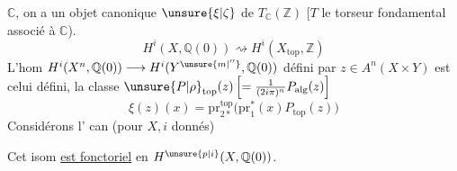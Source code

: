 $\mathbb C$, on a un objet canonique  $\unsure{\xi|\zeta}$ de $T_{\mathbb C}(\mathbb Z)$ [$T$ le torseur fondamental associé à $\mathbb C$).
\[
 H^i(X,\mathbb Q(0))\rightsquigarrow H^i(X_{\mathrm{top}},\mathbb Z)
\]
L'hom $H^i(X^n,\mathbb Q(0))\longrightarrow H^{i}(Y^{\unsure{m|''}},\mathbb Q(0))$ défini par  $z\in A^n(X\times Y)$ est celui défini,   la classe $\unsure{P|\rho}_{\mathrm{top}}(z)\left[=\frac{1}{(2i\pi)^n}P_{\mathrm{alg}}(z)\right]$
\[
 \boxed{\xi(z)(x)=\mathrm{pr}_{2*}^{\mathrm{top}}\bigl(\mathrm{pr}_1^*(x)P_{\mathrm{top}}(z)\bigr)}
\]
Considérons l' can (pour $X,i$ donnés)

Cet isom \uline{ est  fonctoriel} en $H^{\unsure{p|i}}(X,\mathbb Q(0))$.

